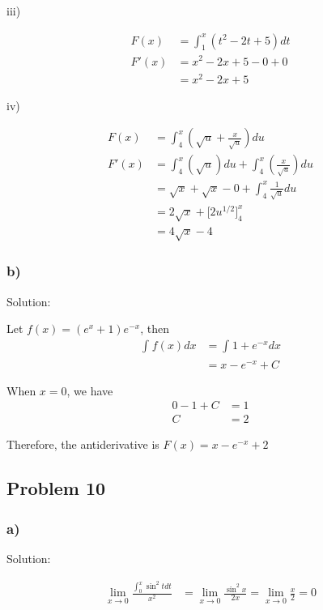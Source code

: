 \documentclass[letterpaper, 11pt]{article}
\newcommand{\1}{\mathds{1}}	%
\theoremstyle{definition}
\begin{document}
  iii)

  \begin{align*}
    F(x)  & = \int_{1}^{x}(t ^{2} - 2t + 5) dt \\
    F'(x) & = x ^{2} - 2x + 5 - 0+ 0           \\
          & = x ^{2} - 2x + 5
  \end{align*}

  iv)

  \begin{align*}
    F(x)  & = \int_{4}^{x}(\sqrt{u} + \frac{x}{\sqrt{u}}) du                 \\
    F'(x) & =\int_{4}^{x}(\sqrt{u}) du +\int_{4}^{x}( \frac{x}{\sqrt{u}}) du \\
          & = \sqrt{x} + \sqrt{x} - 0 + \int_{4}^{x}\frac{1}{\sqrt{u}} du    \\
          & = 2 \sqrt{x} + \Big[ 2 u ^{1/2} \Big]_{4}^{x}                    \\
          & = 4 \sqrt{x} - 4
  \end{align*}

  \subsubsection*{b)}

  Solution:

  Let $f(x) = (e ^{x} + 1) e ^{-x}$, then
  \begin{align*}
    \int_{}^{} f(x) dx & = \int_{}^{} 1 + e ^{-x} dx \\
                       & = x - e ^{-x} + C
  \end{align*}

  When $x = 0$, we have \begin{align*}
    0 - 1 + C & = 1 \\
    C         & = 2
  \end{align*}

  Therefore, the antiderivative is $F(x) = x - e ^{ -x } + 2$

  \subsection*{Problem 10}

  \subsubsection*{a)}

  Solution:

  \begin{align*}
    \lim_{x \to 0}\frac{\int_{0}^{x}\sin ^{2} t dt}{x ^{2}} & =\lim_{x \to 0} \frac{\sin ^{2} x}{2x} = \lim_{x \to 0} \frac{x}{2} = 0
  \end{align*}
\end{document}
